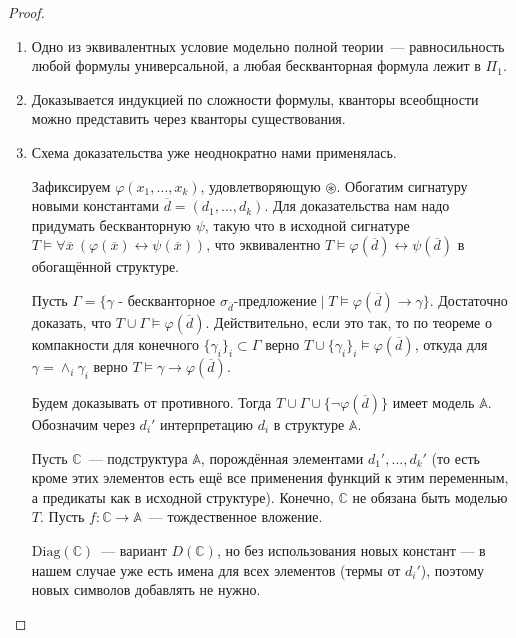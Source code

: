 \begin{proof}\
    \begin{enumerate}
        \item Одно из эквивалентных условие модельно полной теории~— равносильность любой формулы универсальной, а любая бескванторная формула лежит в $\Pi_1$.

        \item %
        Доказывается индукцией по сложности формулы, кванторы всеобщности можно представить через кванторы существования.

   \item
       Схема доказательства уже неоднократно нами применялась.

       Зафиксируем $\varphi(x_1, \ldots, x_k)$, удовлетворяющую $\circledast$. Обогатим сигнатуру новыми константами $\overline{d} = (d_1, \ldots, d_k)$. Для доказательства нам надо придумать бескванторную $\psi$, такую что в исходной сигнатуре $T\models \forall \overline{x}~(\varphi(\overline{x})\leftrightarrow\psi(\overline{x}))$, что эквивалентно $T\models \varphi(\overline{d}) \leftrightarrow \psi(\overline{d})$ в обогащённой структуре.

       Пусть $\Gamma = \{\gamma \text{ - бескванторное }\sigma_{\overline{d}} \text{-предложение}  \mid T\models \varphi(\overline{d})\rightarrow \gamma\}$. Достаточно доказать, что $T\cup\Gamma\models\varphi(\overline{d})$. Действительно, если это так, то по теореме о компакности для конечного $\{\gamma_i\}_i\subset\Gamma$ верно $T\cup\{\gamma_i\}_i\models \varphi(\overline{d})$, откуда для $\gamma=\wedge_i\gamma_i$ верно $T\models \gamma\rightarrow \varphi(\overline{d})$.

       Будем доказывать от противного. Тогда $T\cup\Gamma\cup\{\neg\varphi(\overline{d})\}$ имеет модель $\mathbb{A}$. Обозначим через $d_i'$ интерпретацию $d_i$ в структуре $\mathbb{A}$.

       Пусть $\mathbb{C}$~— подструктура $\mathbb{A}$, порождённая элементами $d_1',\ldots, d_k'$ (то есть кроме этих элементов есть ещё все применения функций к этим переменным, а предикаты как в исходной структуре). Конечно, $\mathbb{C}$ не обязана быть моделью $T$. Пусть $f:\mathbb{C}\rightarrow\mathbb{A}$~— тождественное вложение.
        
       $\text{Diag}(\mathbb{C})$~— вариант $D(\mathbb{C})$, но без использования новых констант — в нашем случае уже есть имена для всех элементов (термы от $d_i'$), поэтому новых символов добавлять не нужно. 


\end{enumerate}
\end{proof}
